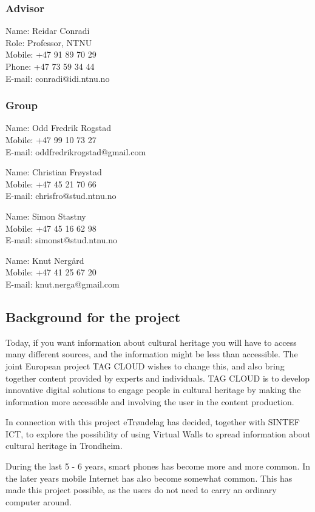 \documentclass[11pt]{book}
\begin{document}
\subsubsection{Advisor}
Name: Reidar Conradi\\
Role: Professor, NTNU\\
Mobile: +47 91 89 70 29\\
Phone: +47 73 59 34 44\\
E-mail: conradi@idi.ntnu.no

\subsubsection{Group}
Name: Odd Fredrik Rogstad\\
Mobile: +47 99 10 73 27\\
E-mail: oddfredrikrogstad@gmail.com

Name: Christian Frøystad\\
Mobile: +47 45 21 70 66\\
E-mail: chrisfro@stud.ntnu.no

Name: Simon Stastny\\
Mobile: +47 45 16 62 98\\
E-mail: simonst@stud.ntnu.no

Name: Knut Nergård\\
Mobile: +47 41 25 67 20\\
E-mail: knut.nerga@gmail.com

\subsection{Background for the project}
Today, if you want information about cultural heritage you will have to access many different sources, and the information might be less than accessible. The joint European project TAG CLOUD wishes to change this, and also bring together content provided by experts and individuals. TAG CLOUD is to develop innovative digital solutions to engage people in cultural heritage by making the information more accessible and involving the user in the content production.

In connection with this project eTrøndelag has decided, together with SINTEF ICT, to explore the possibility of using Virtual Walls to spread information about cultural heritage in Trondheim.

During the last 5 - 6 years, smart phones has become more and more common. In the later years mobile Internet has also become somewhat common. This has made this project possible, as the users do not need to carry an ordinary computer around.
\end{document}
